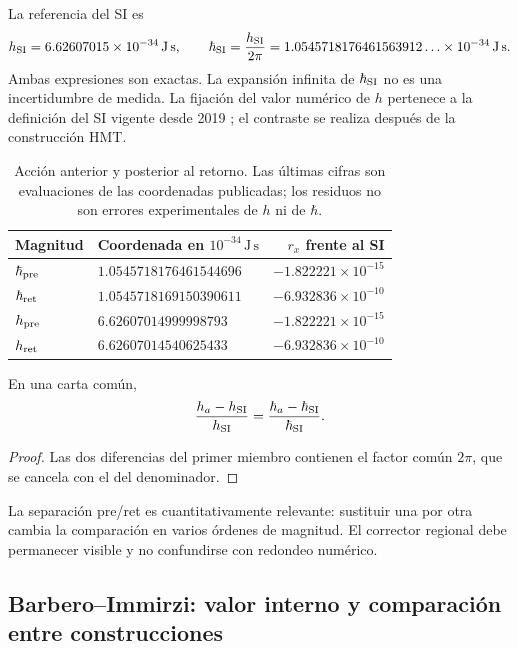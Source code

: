 La referencia del SI es
\[
 h_{\rm SI}=6.62607015\times10^{-34}\,\mathrm{J\,s},\qquad
 \hbar_{\rm SI}=\frac{h_{\rm SI}}{2\pi}
 =1.0545718176461563912\ldots\times10^{-34}\,\mathrm{J\,s}.
\]
Ambas expresiones son exactas. La expansión infinita de \(\hbar_{\rm SI}\)
no es una incertidumbre de medida. La fijación del valor numérico de
\(h\) pertenece a la definición del SI vigente desde 2019
\cite{bipm2018}; el contraste se realiza después de la construcción HMT.

\begin{table}[htbp]
\centering\small
\setlength{\tabcolsep}{5pt}
\begin{tabular}{@{}llr@{}}
\toprule
Magnitud & Coordenada en \(10^{-34}\,\mathrm{J\,s}\) & \(r_x\) frente al SI\\
\midrule
\(\hbar_{\rm pre}\) & \(1.0545718176461544696\) & \(-1.822221\times10^{-15}\)\\
\(\hbar_{\rm ret}\) & \(1.0545718169150390611\) & \(-6.932836\times10^{-10}\)\\
\(h_{\rm pre}\) & \(6.62607014999998793\) & \(-1.822221\times10^{-15}\)\\
\(h_{\rm ret}\) & \(6.62607014540625433\) & \(-6.932836\times10^{-10}\)\\
\bottomrule
\end{tabular}
\caption{Acción anterior y posterior al retorno. Las últimas cifras son
evaluaciones de las coordenadas publicadas; los residuos no son errores
experimentales de \(h\) ni de \(\hbar\).}
\label{tab:ii-planck-comparacion}
\end{table}

\begin{proposition}
En una carta común,
\[
 \frac{h_a-h_{\rm SI}}{h_{\rm SI}}
 =\frac{\hbar_a-\hbar_{\rm SI}}{\hbar_{\rm SI}}.
\]
\end{proposition}
\begin{proof}
Las dos diferencias del primer miembro contienen el factor común
\(2\pi\), que se cancela con el del denominador.
\end{proof}
La separación pre/ret es cuantitativamente relevante: sustituir una por
otra cambia la comparación en varios órdenes de magnitud. El corrector
regional debe permanecer visible y no confundirse con redondeo numérico.

\subsection{Barbero--Immirzi: valor interno y comparación entre construcciones}

